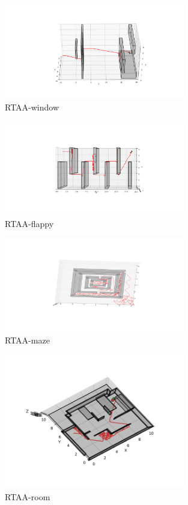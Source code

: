 \documentclass{article} %
\begin{document}
\begin{figure}[H]
	\centering
    \includegraphics[width=0.7\textwidth]{./images/RTAA-window.png}
    \caption{RTAA-window}
    \label{RTAA-window}
\end{figure}

\begin{figure}[H]
	\centering
    \includegraphics[width=0.7\textwidth]{./images/RTAA-flappybird.png}
    \caption{RTAA-flappy}
    \label{RTAA-flappy}
\end{figure}

\begin{figure}[H]
	\centering
    \includegraphics[width=0.7\textwidth]{./images/RTAA-maze.png}
    \caption{RTAA-maze}
    \label{RTAA-maze}
\end{figure}

\begin{figure}[H]
	\centering
    \includegraphics[width=0.7\textwidth]{./images/RTAA-room.png}
    \caption{RTAA-room}
    \label{RTAA-room}
\end{figure}
\end{document}
